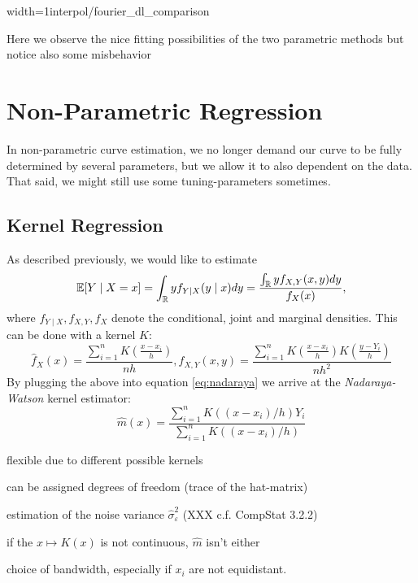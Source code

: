 \begin{my_figure}[h]{width=1\textwidth}{interpol/fourier_dl_comparison}
	\caption{Here we observe the nice fitting possibilities of the two parametric methods but notice also some misbehavior}
	\label{fig:interpol/fourier_dl_comparison}
\end{my_figure}



\section{Non-Parametric Regression}
In non-parametric curve estimation, we no longer demand our curve to be fully determined by several parameters, but we allow it to also dependent on the data. That said, we might still use some tuning-parameters sometimes.
\subsection{Kernel Regression}
\label{sec:Kernel}
As described previously, we would like to estimate
\begin{equation}
	\label{eq:nadaraya}
	\mathbb{E}[Y \mid X=x]
	= \int_{\mathbb{R}} y f_{Y \mid X}(y \mid x) d y
	=\frac{\int_{\mathbb{R}} y f_{X, Y}(x, y) d y}{f_{X}(x)},
\end{equation}
where $f_{Y \mid X}, f_{X, Y}, f_{X}$ denote the conditional, joint and marginal densities.
This can be done with a kernel $K$:
$$
	\hat{f}_{X}(x)=\frac{\sum_{i=1}^{n} K\left(\frac{x-x_{i}}{h}\right)}{n h}, \hat{f}_{X, Y}(x, y)=\frac{\sum_{i=1}^{n} K\left(\frac{x-x_{i}}{h}\right) K\left(\frac{y-Y_{i}}{h}\right)}{n h^{2}}
$$
By plugging the above into equation \ref{eq:nadaraya} we arrive at the \textit{Nadaraya-Watson} kernel estimator:
$$\hat{m}(x)=\frac{\sum_{i=1}^{n} K\left(\left(x-x_{i}\right) / h\right) Y_{i}}{\sum_{i=1}^{n} K\left(\left(x-x_{i}\right) / h\right)}$$


\begin{my_pros_cons_table}{
		\item flexible due to different possible kernels
		\item can be assigned degrees of freedom (trace of the hat-matrix)
		\item estimation of the noise variance $\hat \sigma_\varepsilon^2$ (XXX c.f. CompStat 3.2.2)
	}{
		\item if the $x \mapsto K(x)$ is not continuous, $\hat m $ isn't either
		\item choice of bandwidth, especially if $x_i$ are not equidistant.
	}
\end{my_pros_cons_table}


